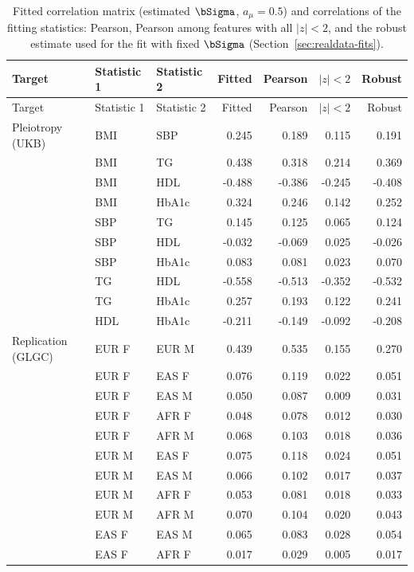 {\footnotesize
\begin{longtable}{lll rrrr}
\caption{Fitted correlation matrix (estimated $\bSigma$, $a_\mu=0.5$) and correlations of the fitting statistics: Pearson, Pearson among features with all $|z|<2$, and the robust estimate used for the fit with fixed $\bSigma$ (Section~\ref{sec:realdata-fits}).}\label{tab:realdata-sigma}\\
\toprule
Target & Statistic 1 & Statistic 2 & Fitted & Pearson & $|z|<2$ & Robust\\
\midrule
\endfirsthead
\toprule
Target & Statistic 1 & Statistic 2 & Fitted & Pearson & $|z|<2$ & Robust\\
\midrule
\endhead
\bottomrule
\endfoot
Pleiotropy (UKB) & BMI & SBP & 0.245 & 0.189 & 0.115 & 0.191\\
 & BMI & TG & 0.438 & 0.318 & 0.214 & 0.369\\
 & BMI & HDL & -0.488 & -0.386 & -0.245 & -0.408\\
 & BMI & HbA1c & 0.324 & 0.246 & 0.142 & 0.252\\
 & SBP & TG & 0.145 & 0.125 & 0.065 & 0.124\\
 & SBP & HDL & -0.032 & -0.069 & 0.025 & -0.026\\
 & SBP & HbA1c & 0.083 & 0.081 & 0.023 & 0.070\\
 & TG & HDL & -0.558 & -0.513 & -0.352 & -0.532\\
 & TG & HbA1c & 0.257 & 0.193 & 0.122 & 0.241\\
 & HDL & HbA1c & -0.211 & -0.149 & -0.092 & -0.208\\
\midrule
Replication (GLGC) & EUR F & EUR M & 0.439 & 0.535 & 0.155 & 0.270\\
 & EUR F & EAS F & 0.076 & 0.119 & 0.022 & 0.051\\
 & EUR F & EAS M & 0.050 & 0.087 & 0.009 & 0.031\\
 & EUR F & AFR F & 0.048 & 0.078 & 0.012 & 0.030\\
 & EUR F & AFR M & 0.068 & 0.103 & 0.018 & 0.036\\
 & EUR M & EAS F & 0.075 & 0.118 & 0.024 & 0.051\\
 & EUR M & EAS M & 0.066 & 0.102 & 0.017 & 0.037\\
 & EUR M & AFR F & 0.053 & 0.081 & 0.018 & 0.033\\
 & EUR M & AFR M & 0.070 & 0.104 & 0.020 & 0.043\\
 & EAS F & EAS M & 0.065 & 0.083 & 0.028 & 0.054\\
 & EAS F & AFR F & 0.017 & 0.029 & 0.005 & 0.017\\

\end{longtable}}
